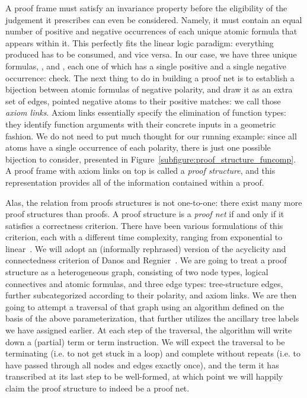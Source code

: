 A proof frame must satisfy an invariance property before the eligibility of the judgement it prescribes can even be considered.
Namely, it must contain an equal number of positive and negative occurrences of each unique atomic formula that appears within it.
This perfectly fits the linear logic paradigm: everything produced has to be consumed, and vice versa.
In our case, we have three unique formulas, ,  and , each one of which has a single positive and a single negative occurrence: check.
The next thing to do in building a proof net is to establish a bijection between atomic formulas of negative polarity, and draw it as an extra set of edges, pointed negative atoms to their positive matches: we call those \textit{axiom links}.
Axiom links essentially specify the elimination of function types: they identify function arguments with their concrete inputs in a geometric fashion.
We do not need to put much thought for our running example: since all atoms have a single occurrence of each polarity, there is just one possible bijection to consider, presented in Figure~\ref{subfigure:proof_structure_funcomp}.
A proof frame with axiom links on top is called a \textit{proof structure}, and this representation provides all of the information contained within a proof.

Alas, the relation from proofs structures is not one-to-one: there exist many more proof structures than proofs.
A proof structure is a \textit{proof net} if and only if it satisfies a correctness criterion.
There have been various formulations of this criterion, each with a different time complexity, ranging from exponential to linear~\cite{girard1987linear,danos1989structure,murawski2000dominator,guerrini2011linear}.
We will adopt an (informally rephrased) version of the acyclicity and connectedness criterion of Danos and Regnier~\cite{danos1989structure}.
We are going to treat a proof structure as a heterogeneous graph, consisting of two node types, logical connectives and atomic formulas, and three edge types: tree-structure edges, further subcategorized according to their polarity, and axiom links.
We are then going to attempt a traversal of that graph using an algorithm defined on the basis of the above parameterization, that further utilizes the  ancillary tree labels we have assigned earlier.
At each step of the traversal, the algorithm will write down a (partial) term or term instruction.
We will expect the traversal to be terminating (i.e. to not get stuck in a loop) and complete without repeats (i.e. to have passed through all nodes and edges exactly once), and the term it has transcribed at its last step to be well-formed, at which point we will happily claim the proof structure to indeed be a proof net.

